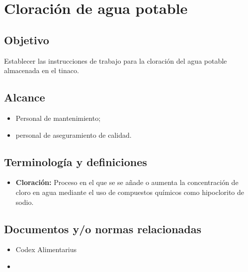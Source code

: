 \renewcommand{\MenorVer}{0}
\renewcommand{\MayorVer}{2}
\renewcommand{\Codigo}{HYS-24-IT}
\renewcommand{\FechaPub}{2023--01}
\renewcommand{\Titulo}{Cloración de agua potable}

\section{\Titulo}

\subsection{Objetivo}

Establecer las instrucciones de trabajo para la cloración del agua potable almacenada en el tinaco.

\subsection{Alcance}

\begin{itemize}
	\item Personal de mantenimiento;
	\item personal de aseguramiento de calidad.
\end{itemize}

\subsection{Terminología y definiciones}

\begin{itemize}
	\item \textbf{Cloración:} Proceso en el que se se añade o aumenta la concentración de cloro en agua mediante el uso de compuestos químicos como hipoclorito de sodio.
\end{itemize}

\subsection{Documentos y/o normas relacionadas}

\begin{itemize}
	\item Codex Alimentarius
	\item \BitClor
\end{itemize}

